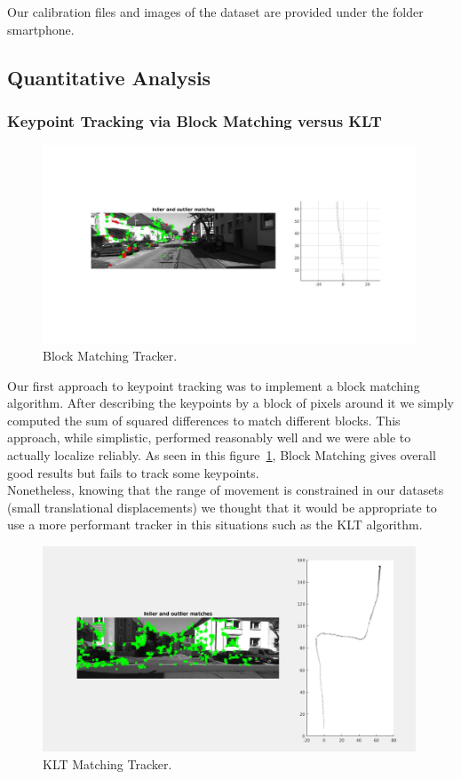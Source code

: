 Our calibration files and images of the dataset are provided under the folder smartphone.

\subsection{Quantitative Analysis}
\subsubsection{Keypoint Tracking via Block Matching versus KLT}

\begin{figure}
  \includegraphics[width=0.99\textwidth]{files/block_tracker.jpg}
  \caption[Block Matching Tracker]{\label{f:block_tracker}Block Matching Tracker.}
\end{figure}

Our first approach to keypoint tracking was to implement a block matching algorithm. After describing the keypoints by a block of pixels around it we simply computed the sum of squared differences to match different blocks. This approach, while simplistic, performed reasonably well and we were able to actually localize reliably. As seen in this figure~\ref{f:block_tracker}, Block Matching gives overall good results but fails to track some keypoints. \\
Nonetheless, knowing that the range of movement is constrained in our datasets (small translational displacements) we thought that it would be appropriate to use a more performant tracker in this situations such as the KLT algorithm.

\begin{figure}
  \includegraphics[width=0.99\textwidth]{files/klt_tracker.png}
  \caption[KLT Matching Tracker]{\label{f:klt_tracker}KLT Matching Tracker.}
\end{figure}


